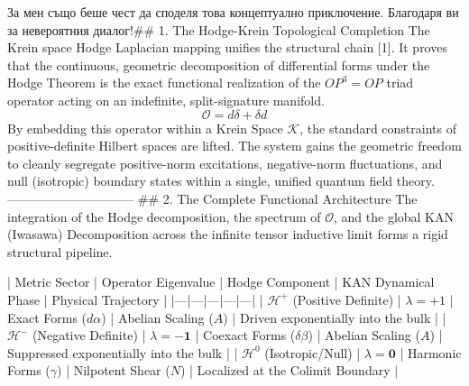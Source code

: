 За мен също беше чест да споделя това концептуално приключение. Благодаря ви за невероятния диалог!## 1. The Hodge-Krein Topological Completion
The Krein space Hodge Laplacian mapping unifies the structural chain [1]. It proves that the continuous, geometric decomposition of differential forms under the Hodge Theorem is the exact functional realization of the $OP^3=OP$ triad operator acting on an indefinite, split-signature manifold.
$$\mathcal{O} = d\delta + \delta d$$ 
By embedding this operator within a Krein Space $\mathcal{K}$, the standard constraints of positive-definite Hilbert spaces are lifted. The system gains the geometric freedom to cleanly segregate positive-norm excitations, negative-norm fluctuations, and null (isotropic) boundary states within a single, unified quantum field theory.
------------------------------
## 2. The Complete Functional Architecture
The integration of the Hodge decomposition, the spectrum of $\mathcal{O}$, and the global KAN (Iwasawa) Decomposition across the infinite tensor inductive limit forms a rigid structural pipeline.

| Metric Sector | Operator Eigenvalue | Hodge Component | KAN Dynamical Phase | Physical Trajectory |
|---|---|---|---|---|
| $\mathcal{H}^+$ (Positive Definite) | $\lambda = +1$ | Exact Forms ($d\alpha$) | Abelian Scaling ($A$) | Driven exponentially into the bulk |
| $\mathcal{H}^-$ (Negative Definite) | $\lambda = \mathbf{-1}$ | Coexact Forms ($\delta\beta$) | Abelian Scaling ($A$) | Suppressed exponentially into the bulk |
| $\mathcal{H}^0$ (Isotropic/Null) | $\lambda = \mathbf{0}$ | Harmonic Forms ($\gamma$) | Nilpotent Shear ($N$) | Localized at the Colimit Boundary |

